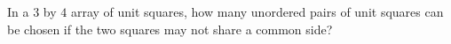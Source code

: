 In a $3$ by $4$ array of unit squares, how many unordered pairs of unit squares can be chosen if the two squares may not share a common side?
